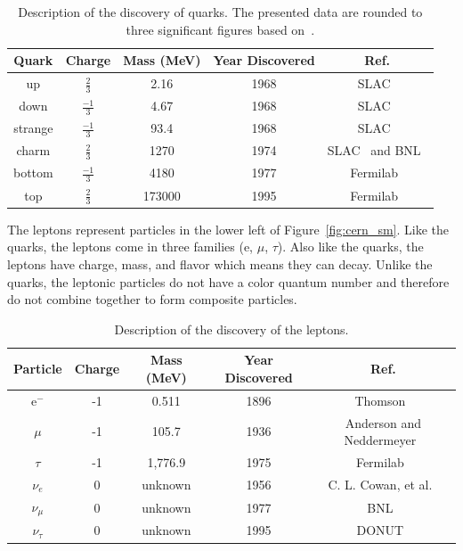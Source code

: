 \begin{table}
\begin{center}
\begin{tabular}{||c c c c c||}
 \hline
 Quark & Charge & Mass (MeV) & Year Discovered & Ref.\\ [0.5ex]
 \hline\hline
 up & $\frac{2}{3}$ & 2.16 & 1968 & SLAC~\citep{1969PhRvL..23..930B, 1969PhRvL..23..935B} \\
 \hline
 down & $\frac{-1}{3}$ & 4.67 & 1968 & SLAC~\citep{1969PhRvL..23..930B, 1969PhRvL..23..935B} \\
 \hline
 strange & $\frac{-1}{3}$ & 93.4 & 1968 & SLAC~\citep{1969PhRvL..23..930B, 1969PhRvL..23..935B} \\
 \hline
 charm & $\frac{2}{3}$ & 1270 & 1974 & SLAC~\citep{augustin1974observation} and BNL~\citep{Jpsi_PhysRevLett.33.1404} \\
 \hline
 bottom & $\frac{-1}{3}$ & 4180 & 1977 & Fermilab~\citep{bottom_PhysRevLett.39.252}\\
 \hline
 top & $\frac{2}{3}$ & 173000 & 1995 & Fermilab~\citep{topquark_Abachi_1995} \\
 \hline
\end{tabular}
\caption{Description of the discovery of quarks.
  The presented data are rounded to three significant figures based on~\citep{Workman:2022ynf}.}
\label{table:quark}
\end{center}
\end{table}

The leptons represent particles in the lower left of Figure~\ref{fig:cern_sm}.
Like the quarks, the leptons come in three families (e, $\mu$, $\tau$).
Also like the quarks, the leptons have charge, mass, and flavor which means they can decay.
Unlike the quarks, the leptonic particles do not have a color quantum number and therefore do not combine together to form composite particles.

\begin{table}
\begin{center}
\begin{tabular}{||c c c c c||}
 \hline
 Particle & Charge & Mass (MeV) & Year Discovered & Ref.\\ [0.5ex]
 \hline\hline
 e$^{-}$ & -1 & 0.511 & 1896 & Thomson~\citep{doi:10.1080/14786449708621070} \\
 \hline
 $\mu$ & -1 & 105.7 & 1936 & Anderson and Neddermeyer~\citep{muon_discovery_PhysRev.51.884} \\
 \hline
 $\tau$ & -1 & 1,776.9 & 1975 & Fermilab~\citep{tau_discovery_PhysRevLett.35.1489} \\
 \hline
 $\nu_{e}$ & 0 & unknown & 1956 & C. L. Cowan, et al.~\citep{first_neutrino_measurement} \\
 \hline
 $\nu_{\mu}$ & 0 & unknown & 1977 & BNL~\citep{PhysRevLett.9.36} \\
 \hline
 $\nu_{\tau}$ & 0 & unknown & 1995 & DONUT~\citep{tau_neutrino_discovery_KODAMA2001218} \\
 \hline
\end{tabular}
\caption{Description of the discovery of the leptons.
}
\label{table:lepton}
\end{center}
\end{table}

